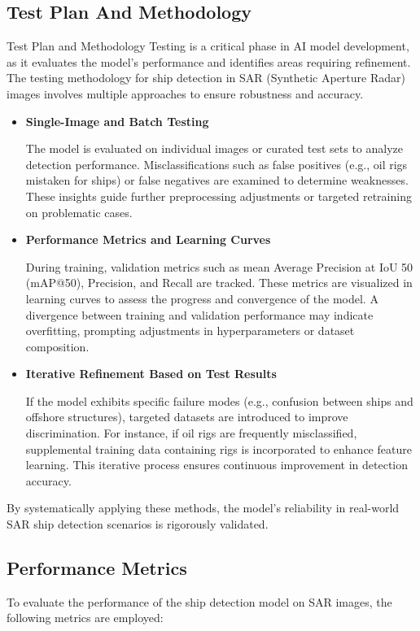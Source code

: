 \documentclass{article}
\begin{document}
\subsection{Test Plan And Methodology}
Test Plan and Methodology
Testing is a critical phase in AI model development, as it evaluates the model's performance and identifies areas requiring refinement. The testing methodology for ship detection in SAR (Synthetic Aperture Radar) images involves multiple approaches to ensure robustness and accuracy. \begin{itemize}
    \item \textbf{Single-Image and Batch Testing}
    
    The model is evaluated on individual images or curated test sets to analyze detection performance. Misclassifications such as false positives (e.g., oil rigs mistaken for ships) or false negatives are examined to determine weaknesses. These insights guide further preprocessing adjustments or targeted retraining on problematic cases. \item \textbf{Performance Metrics and Learning Curves}
    
    During training, validation metrics such as mean Average Precision at IoU 50 (mAP@50), Precision, and Recall are tracked. These metrics are visualized in learning curves to assess the progress and convergence of the model. A divergence between training and validation performance may indicate overfitting, prompting adjustments in hyperparameters or dataset composition. \item \textbf{Iterative Refinement Based on Test Results}
    
    If the model exhibits specific failure modes (e.g., confusion between ships and offshore structures), targeted datasets are introduced to improve discrimination. For instance, if oil rigs are frequently misclassified, supplemental training data containing rigs is incorporated to enhance feature learning. This iterative process ensures continuous improvement in detection accuracy.
\end{itemize}

By systematically applying these methods, the model’s reliability in real-world SAR ship detection scenarios is rigorously validated. \subsection{Performance Metrics}
To evaluate the performance of the ship detection model on SAR images, the following metrics are employed:
\end{document}
